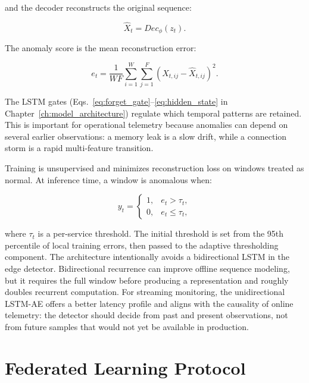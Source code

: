 and the decoder reconstructs the original sequence:

\begin{equation}
    \hat{X}_t = Dec_\phi(z_t).
    \label{eq:decoder}
\end{equation}

The anomaly score is the mean reconstruction error:

\begin{equation}
    e_t = \frac{1}{WF}\sum_{i=1}^{W}\sum_{j=1}^{F}
    \left(X_{t,ij} - \hat{X}_{t,ij}\right)^2 .
    \label{eq:reconstruction_error}
\end{equation}

The LSTM gates (Eqs.~\ref{eq:forget_gate}--\ref{eq:hidden_state} in
Chapter~\ref{ch:model_architecture}) regulate which temporal patterns are
retained. This is important for operational telemetry because anomalies can
depend on several earlier observations: a memory leak is a slow drift, while
a connection storm is a rapid multi-feature transition.

Training is unsupervised and minimizes reconstruction loss on windows treated as
normal. At inference time, a window is anomalous when:

\begin{equation}
    y_t =
    \begin{cases}
    1, & e_t > \tau_t,\\
    0, & e_t \leq \tau_t,
    \end{cases}
    \label{eq:anomaly_decision}
\end{equation}

where $\tau_t$ is a per-service threshold. The initial threshold is set from the
95th percentile of local training errors, then passed to the adaptive
thresholding component.
The architecture intentionally avoids a bidirectional LSTM in the edge detector.
Bidirectional recurrence can improve offline sequence modeling, but it requires
the full window before producing a representation and roughly doubles recurrent
computation. For streaming monitoring, the unidirectional LSTM-AE offers a
better latency profile and aligns with the causality of online telemetry: the
detector should decide from past and present observations, not from future
samples that would not yet be available in production.

\section{Federated Learning Protocol}
\label{sec:fl_architecture}

